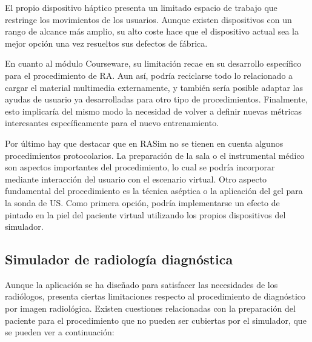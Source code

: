 El propio dispositivo háptico presenta un limitado espacio de trabajo que restringe los movimientos de los usuarios. Aunque existen dispositivos con un rango de alcance más amplio, su  alto coste hace que el dispositivo actual sea la mejor opción una vez resueltos sus defectos de fábrica.


En cuanto al módulo \ac{Courseware}, su limitación recae en su desarrollo específico para el procedimiento de \ac{RA}.   %
Aun así, podría reciclarse todo lo relacionado a cargar el material multimedia externamente, y también sería posible adaptar las ayudas de usuario ya desarrolladas para otro tipo de procedimientos. Finalmente, esto implicaría del mismo modo la necesidad de volver a definir nuevas métricas interesantes específicamente para el nuevo entrenamiento.


Por último hay que destacar que en \ac{RASim} no se tienen en cuenta algunos procedimientos protocolarios. La preparación de la sala o el instrumental médico son aspectos importantes del procedimiento, lo cual se podría incorporar mediante interacción del usuario con el escenario virtual. Otro aspecto fundamental del procedimiento es la técnica aséptica o la aplicación del gel para la sonda de \ac{US}. Como primera opción, podría implementarse un efecto de pintado en la piel del paciente virtual utilizando los propios dispositivos del simulador. 


\subsection{Simulador de radiología diagnóstica}

Aunque la aplicación se ha diseñado para satisfacer las necesidades de los radiólogos, presenta ciertas limitaciones respecto al procedimiento de diagnóstico por imagen radiológica. Existen cuestiones relacionadas con la preparación del paciente para el procedimiento que no pueden ser cubiertas por el simulador, que se pueden ver a continuación:

